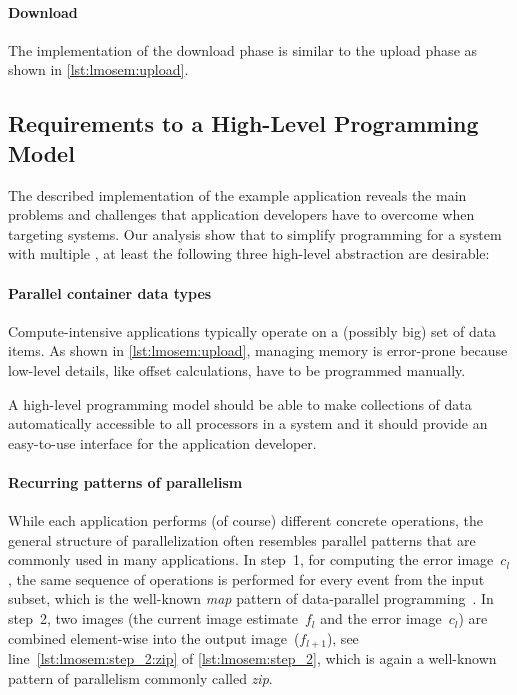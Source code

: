 \paragraph{Download}
The implementation of the download phase is similar to the upload phase as shown in \autoref{lst:lmosem:upload}.


\subsection{Requirements to a High-Level Programming Model}
\label{section:requirements}
The described implementation of the example application reveals the main problems and challenges that application developers have to overcome when targeting \GPU systems.
Our analysis show that to simplify programming for a system with multiple \GPUs, at least the following three high-level abstraction are desirable:

\paragraph{Parallel container data types}
Compute-intensive applications typically operate on a (possibly big) set of data items.
As shown in \autoref{lst:lmosem:upload}, managing memory is error-prone because low-level details, like offset calculations, have to be programmed manually.

A high-level programming model should be able to make collections of data automatically accessible to all processors in a system and it should provide an easy-to-use interface for the application developer.

\paragraph{Recurring patterns of parallelism}
While each application performs (of course) different concrete operations, the general structure of parallelization often resembles parallel patterns that are commonly used in many applications.
In step~1, for computing the error image~$c_l$, the same sequence of operations is performed for every event from the input subset, which is the well-known \emph{map} pattern of data-parallel programming~\cite{GorlatchCo2011}.
In step~2, two images (the current image estimate~$f_l$ and the error image~$c_l$) are combined element-wise into the output image~($f_{l+1}$), see line~\autoref{lst:lmosem:step_2:zip} of \autoref{lst:lmosem:step_2}, which is again a well-known pattern of parallelism commonly called \emph{zip}.


